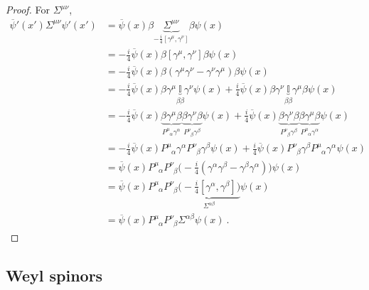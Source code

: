 \begin{proof}
        For $\Sigma^{\mu\nu}$, 
        \begin{equation*}
        \begin{aligned}
            \overline \psi' (x') \Sigma^{\mu\nu} \psi' (x') & = \overline \psi (x) \beta \underbrace{\Sigma^{\mu\nu}}_{-\frac{i}{4} [\gamma^\mu, \gamma^\nu]} \beta \psi (x) \\ & = - \frac{i}{4} \overline \psi (x) \beta [\gamma^\mu,  \gamma^\nu] \beta \psi (x) \\ & = - \frac{i}{4} \overline \psi (x) \beta (\gamma^\mu \gamma^\nu - \gamma^\nu \gamma^\mu) \beta \psi (x) \\ & = - \frac{i}{4} \overline \psi (x) \beta \gamma^\mu \underbrace{\mathbb I }_{\beta \beta} \gamma^\nu \psi (x) + \frac{i}{4} \overline \psi (x) \beta \gamma^\nu \underbrace{\mathbb I }_{\beta \beta} \gamma^\mu \beta \psi (x) \\ & = - \frac{i}{4} \overline \psi (x) \underbrace{\beta \gamma^\mu \beta}_{P^\mu_{\phantom \mu \alpha} \gamma^\alpha} \underbrace{\beta \gamma^\nu \beta}_{P^\nu_{\phantom \nu \beta} \gamma^\beta} \psi (x) + \frac{i}{4} \overline \psi (x) \underbrace{\beta \gamma^\nu \beta}_{P^\nu_{\phantom \nu \beta} \gamma^\beta} \underbrace{\beta \gamma^\mu \beta}_{P^\mu_{\phantom \mu \alpha} \gamma^\alpha} \psi (x) \\ & = - \frac{i}{4} \overline \psi (x) P^\mu_{\phantom \mu \alpha} \gamma^\alpha P^\nu_{\phantom \nu \beta} \gamma^\beta \psi (x) + \frac{i}{4} \overline \psi (x) P^\nu_{\phantom \nu \beta} \gamma^\beta P^\mu_{\phantom \mu \alpha} \gamma^\alpha \psi (x) \\ & = \overline \psi (x) P^\mu_{\phantom \mu \alpha} P^\nu_{\phantom \nu \beta} \Big (-\frac{i}{4} (\gamma^\alpha \gamma^\beta - \gamma^\beta \gamma^\alpha) \Big ) \psi (x) \\ & = \overline \psi (x) P^\mu_{\phantom \mu \alpha} P^\nu_{\phantom \nu \beta} \underbrace{\Big (-\frac{i}{4} [\gamma^\alpha, \gamma^\beta] \Big )}_{\Sigma^{\alpha \beta}} \psi (x) \\ & = \overline \psi (x) P^\mu_{\phantom \mu \alpha} P^\nu_{\phantom \nu \beta} \Sigma^{\alpha \beta} \psi (x) ~.
        \end{aligned}
        \end{equation*}
    \end{proof}

\subsection{Weyl spinors}   

